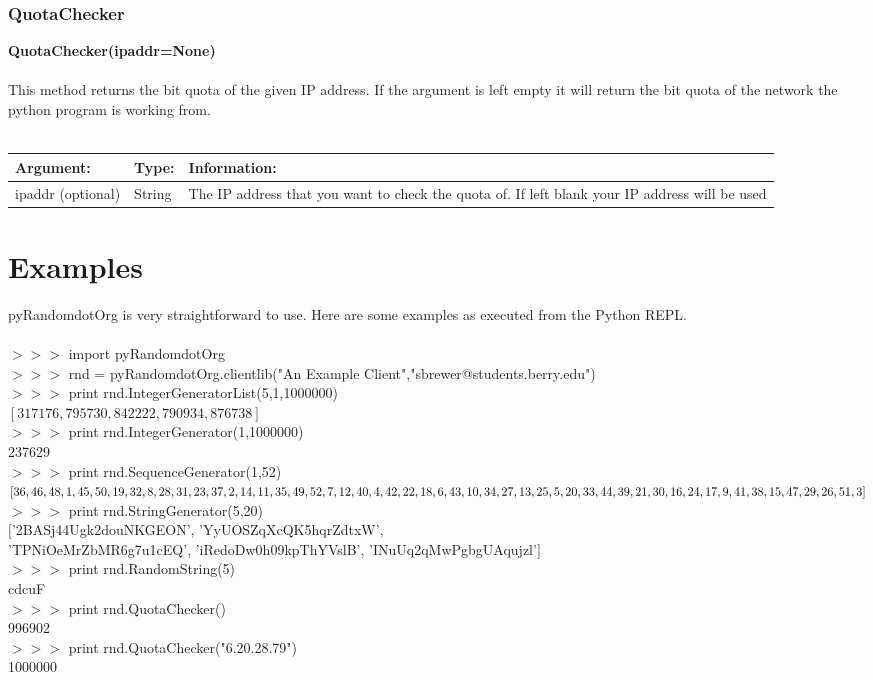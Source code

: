 \documentclass[12 pt]{report}
\begin{document}
\subsection{QuotaChecker}

\textbf{QuotaChecker(ipaddr=None)}\\\\
This method returns the bit quota of the given IP address. If the argument is left empty it will return the bit quota of the network
the python program is working from.\\\\
  \begin{tabular}{ | l | l | p{10cm} | }
    \hline
    \textbf{Argument:} & \textbf{Type:} & \textbf{Information:} \\ \hline
    ipaddr (optional) & String & The IP address that you want to check the quota of. If left blank your IP address will be used \\ 
    \hline
  \end{tabular}


\chapter{Examples}

pyRandomdotOrg is very straightforward to use. Here are some examples
as executed from the Python REPL.\\\\
\noindent
$>>>$ import pyRandomdotOrg\\
$>>>$ rnd = pyRandomdotOrg.clientlib("An Example Client","sbrewer@students.berry.edu")\\
$>>>$ print rnd.IntegerGeneratorList(5,1,1000000)\\
$[317176, 795730, 842222, 790934, 876738]$\\ 
$>>>$ print rnd.IntegerGenerator(1,1000000)\\
237629\\
$>>>$ print rnd.SequenceGenerator(1,52)\\
$[36, 46, 48, 1, 45, 50, 19, 32, 8, 28, 31, 23, 37, 2, 14, 11, 35, 49, 52, 7, 12, 40, 4, 42, 22,\\ 18, 6, 43, 10, 34, 27, 13, 25, 5, 20, 33, 44, 39, 21, 30, 16, 24, 17, 9, 41, 38, 15, 47, 29, 26, 51, 3]$\\
$>>>$ print rnd.StringGenerator(5,20)\\
$[$'2BASj44Ugk2douNKGEON', 'YyUOSZqXcQK5hqrZdtxW',\\ 'TPNiOeMrZbMR6g7u1cEQ', 'iRedoDw0h09kpThYVslB', 'INuUq2qMwPgbgUAqujzl'$]$\\
$>>>$ print rnd.RandomString(5)\\
cdcuF\\
$>>>$ print rnd.QuotaChecker()\\
996902\\
$>>>$ print rnd.QuotaChecker("6.20.28.79")\\
1000000\\
\indent
\end{document}
